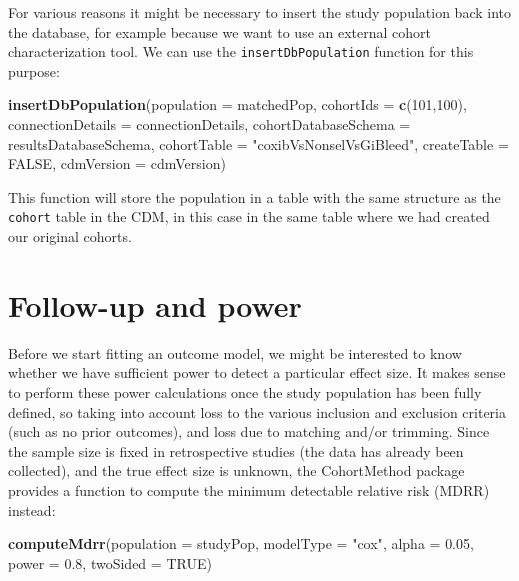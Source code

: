 \documentclass[]{article}
\newenvironment{Shaded}{\begin{snugshade}}{\end{snugshade}}
\newcommand{\DataTypeTok}[1]{\textcolor[rgb]{0.13,0.29,0.53}{#1}}
\newcommand{\DecValTok}[1]{\textcolor[rgb]{0.00,0.00,0.81}{#1}}
\newcommand{\FloatTok}[1]{\textcolor[rgb]{0.00,0.00,0.81}{#1}}
\newcommand{\KeywordTok}[1]{\textcolor[rgb]{0.13,0.29,0.53}{\textbf{#1}}}
\newcommand{\NormalTok}[1]{#1}
\newcommand{\OtherTok}[1]{\textcolor[rgb]{0.56,0.35,0.01}{#1}}
\newcommand{\StringTok}[1]{\textcolor[rgb]{0.31,0.60,0.02}{#1}}
\begin{document}
For various reasons it might be necessary to insert the study population
back into the database, for example because we want to use an external
cohort characterization tool. We can use the \texttt{insertDbPopulation}
function for this purpose:

\begin{Shaded}
\begin{Highlighting}[]
\KeywordTok{insertDbPopulation}\NormalTok{(}\DataTypeTok{population =}\NormalTok{ matchedPop,}
                   \DataTypeTok{cohortIds =} \KeywordTok{c}\NormalTok{(}\DecValTok{101}\NormalTok{,}\DecValTok{100}\NormalTok{),}
                   \DataTypeTok{connectionDetails =}\NormalTok{ connectionDetails,}
                   \DataTypeTok{cohortDatabaseSchema =}\NormalTok{ resultsDatabaseSchema,}
                   \DataTypeTok{cohortTable =} \StringTok{"coxibVsNonselVsGiBleed"}\NormalTok{,}
                   \DataTypeTok{createTable =} \OtherTok{FALSE}\NormalTok{,}
                   \DataTypeTok{cdmVersion =}\NormalTok{ cdmVersion)}
\end{Highlighting}
\end{Shaded}

This function will store the population in a table with the same
structure as the \texttt{cohort} table in the CDM, in this case in the
same table where we had created our original cohorts.

\hypertarget{follow-up-and-power}{%
\section{Follow-up and power}\label{follow-up-and-power}}

Before we start fitting an outcome model, we might be interested to know
whether we have sufficient power to detect a particular effect size. It
makes sense to perform these power calculations once the study
population has been fully defined, so taking into account loss to the
various inclusion and exclusion criteria (such as no prior outcomes),
and loss due to matching and/or trimming. Since the sample size is fixed
in retrospective studies (the data has already been collected), and the
true effect size is unknown, the CohortMethod package provides a
function to compute the minimum detectable relative risk (MDRR) instead:

\begin{Shaded}
\begin{Highlighting}[]
\KeywordTok{computeMdrr}\NormalTok{(}\DataTypeTok{population =}\NormalTok{ studyPop,}
            \DataTypeTok{modelType =} \StringTok{"cox"}\NormalTok{,}
            \DataTypeTok{alpha =} \FloatTok{0.05}\NormalTok{,}
            \DataTypeTok{power =} \FloatTok{0.8}\NormalTok{,}
            \DataTypeTok{twoSided =} \OtherTok{TRUE}\NormalTok{)}
\end{Highlighting}
\end{Shaded}
\end{document}
